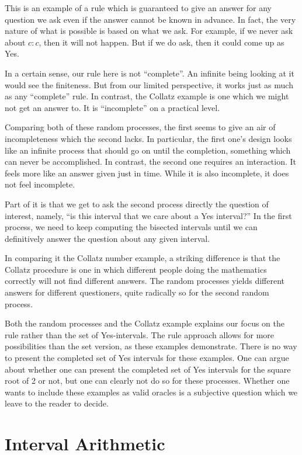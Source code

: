 \documentclass[12pt]{article}
\begin{document}
This is an example of a rule which is guaranteed to give an answer for any question we ask even if the answer cannot be known in advance. In fact, the very nature of what is possible is based on what we ask. For example, if we never ask about  $c:c$, then it will not happen. But if we do ask, then it could come up as Yes. 

In a certain sense, our rule here is not ``complete''. An infinite being looking at it would see the finiteness. But from our limited perspective, it works just as much as any ``complete'' rule. In contrast, the Collatz example is one which we might not get an answer to. It is ``incomplete'' on a practical level. 

Comparing both of these random processes, the first seems to give an air of incompleteness which the second lacks. In particular, the first one's design looks like an infinite process that should go on until the completion, something which can never be accomplished. In contrast, the second one requires an interaction. It feels more like an answer given just in time. While it is also incomplete, it does not feel incomplete. 
 
Part of it is that we get to ask the second process directly the question of interest, namely, ``is this interval that we care about a Yes interval?'' In the first process, we need to keep computing the bisected intervals until we can definitively answer the question about any given interval. 

In comparing it the Collatz number example, a striking difference is that the Collatz procedure is one in which different people doing the mathematics correctly will not find different answers. The random processes yields different answers for different questioners, quite radically so for the second random process. 

Both the random processes and the Collatz example explains our focus on the rule rather than the set of Yes-intervals. The rule approach allows for more possibilities than the set version, as these examples demonstrate. There is no way to present the completed set of Yes intervals for these examples. One can argue about whether one can present the completed set of Yes intervals for the square root of 2 or not, but one can clearly not do so for these processes. Whether one wants to include these examples as valid oracles is a subjective question which we leave to the reader to decide. 

\section{Interval Arithmetic}
\end{document}
